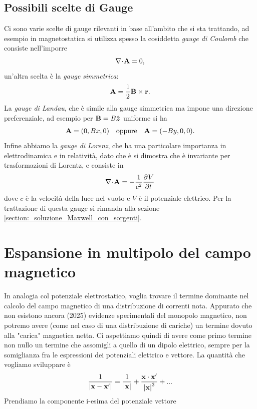 \subsection{Possibili scelte di Gauge}
Ci sono varie scelte di gauge rilevanti in base all'ambito che si sta trattando, ad esempio in magnetostatica si utilizza spesso la cosiddetta 
\textit{gauge di Coulomb} che consiste nell'imporre
\begin{align}
  \nabla\!\cdot\!\mathbf{ A } = 0,
\end{align}
un'altra scelta è la \textit{gauge simmetrica}:
\begin{align}
  \mathbf{ A } = \frac{1}{2} \mathbf{ B } \times \mathbf{ r }.
\end{align}
La \textit{gauge di Landau}, che è simile alla gauge simmetrica ma impone una direzione preferenziale, ad esempio per $ \mathbf{ B } = B \hat{\boldsymbol{z}} $ 
uniforme si ha
\begin{align}
  \mathbf{ A } = (0,Bx,0) \quad \text{oppure} \quad \mathbf{ A } = (-By, 0,0).
\end{align}
Infine abbiamo la \textit{gauge di Lorenz}, che ha una particolare importanza in elettrodinamica e in relatività, dato che è si dimostra che è invariante 
per trasformazioni di Lorentz, e consiste in
\begin{align}
  \nabla\!\cdot\!\mathbf{ A } = -\frac{1}{c^2} \frac{\partial^{} {V}}{\partial {t}^{}}
\end{align}
dove $ c $ è la velocità della luce nel vuoto e $ V $ è il potenziale elettrico. Per la trattazione di questa gauge si rimanda alla 
sezione \ref{section:_soluzione_Maxwell_con_sorgenti}.


\section{Espansione in multipolo del campo magnetico} \label{section :B espansione multipolo}
In analogia col potenziale elettrostatico, voglia trovare il termine dominante nel calcolo del campo magnetico di una distribuzione di correnti nota.
Appurato che non esistono ancora (2025) evidenze sperimentali del monopolo magnetico, non potremo avere (come nel caso di una distribuzione di cariche) 
un termine dovuto alla "carica" magnetica netta. Ci aspettiamo quindi di avere come primo termine non nullo un termine che assomigli a quello di un dipolo
 elettrico, sempre per la somiglianza fra le espressioni dei potenziali elettrico e vettore. La quantità che vogliamo sviluppare è 
\begin{equation}
 \frac{1}{\mathbf{ |x-x'| }} = \frac{1}{\mathbf{ |x| }} + \frac{\mathbf{ x \cdot x' }}{\mathbf{ |x| }^3} + ...
\end{equation}
Prendiamo la componente i-esima del potenziale vettore

